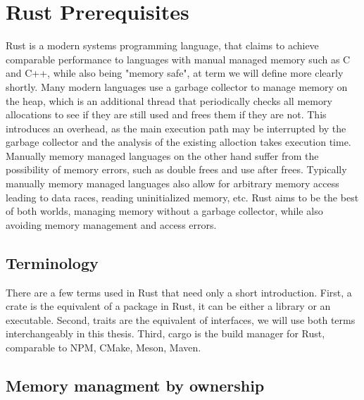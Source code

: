 \section{Rust Prerequisites}
\label{sec:background:rust}

Rust is a modern systems programming language,
that claims to achieve comparable performance to languages with manual managed memory such as C and C++,
while also being "memory safe", at term we will define more clearly shortly.
Many modern languages use a garbage collector to manage memory on the heap,
which is an additional thread that periodically checks all memory allocations to see if they are still used and frees them if they are not.
This introduces an overhead, as the main execution path may be interrupted by the garbage collector and the analysis of the existing alloction takes execution time.
Manually memory managed languages on the other hand suffer from the possibility of memory errors, such as double frees and use after frees.
Typically manually memory managed languages also allow for arbitrary memory access leading to data races, reading uninitialized memory, etc.
Rust aims to be the best of both worlds, managing memory without a garbage collector, while also avoiding memory management and access errors.

\subsection{Terminology}
\label{sec:background:terminology}

There are a few terms used in Rust that need only a short introduction.
First, a crate is the equivalent of a package in Rust, it can be either a library or an executable.
Second, traits are the equivalent of interfaces, we will use both terms interchangeably in this thesis.
Third, cargo is the build manager for Rust, comparable to NPM, CMake, Meson, Maven.

\subsection{Memory managment by ownership}
\label{sec:background:rust:ownership}

